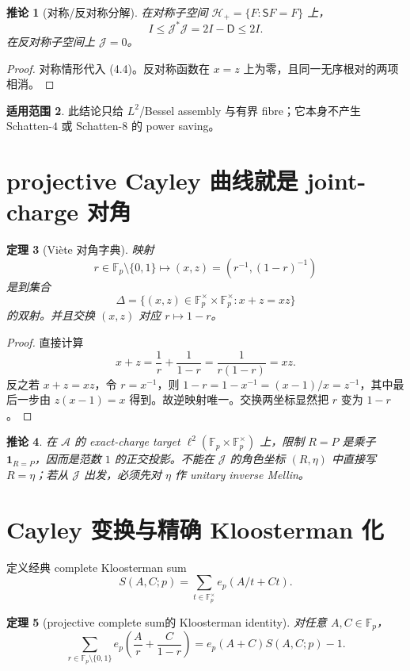 \documentclass[11pt,a4paper]{ctexart}
\newtheorem{theorem}{定理}[section]
\newtheorem{corollary}[theorem]{推论}
\theoremstyle{definition}
\newtheorem{remark}[theorem]{适用范围}
\newcommand{\F}{\mathbb F}
\newcommand{\G}{\F_p^\times}
\newcommand{\ep}{e_p}
\newcommand{\1}{\mathbf 1}
\begin{document}
\begin{corollary}[对称/反对称分解]
在对称子空间 $\mathscr H_+=\{F:\mathsf SF=F\}$ 上，
\[
I\le\mathcal J^*\mathcal J=2I-\mathsf D\le2I.
\tag{4.6}
\]
在反对称子空间上 $\mathcal J=0$。
\end{corollary}

\begin{proof}
对称情形代入 (4.4)。反对称函数在 $x=z$ 上为零，且同一无序根对的两项相消。
\end{proof}

\begin{remark}
此结论只给 $L^2$/Bessel assembly 与有界 fibre；它本身不产生
Schatten-$4$ 或 Schatten-$8$ 的 power saving。
\end{remark}

\section{projective Cayley 曲线就是 joint-charge 对角}

\begin{theorem}[Vi\`ete 对角字典]
映射
\[
r\in\F_p\setminus\{0,1\}
\longmapsto
(x,z)=\left(r^{-1},(1-r)^{-1}\right)
\tag{5.1}
\]
是到集合
\[
\Delta=\{(x,z)\in\G\times\G:x+z=xz\}
\]
的双射。并且交换 $(x,z)$ 对应 $r\mapsto1-r$。
\end{theorem}

\begin{proof}
直接计算
\[
x+z=\frac{1}{r}+\frac1{1-r}
=\frac1{r(1-r)}=xz.
\]
反之若 $x+z=xz$，令 $r=x^{-1}$，则
$1-r=1-x^{-1}=(x-1)/x=z^{-1}$，其中最后一步由
$z(x-1)=x$ 得到。故逆映射唯一。交换两坐标显然把 $r$ 变为 $1-r$。
\end{proof}

\begin{corollary}
在 $\mathcal A$ 的 exact-charge target
$\ell^2(\F_p\times\G)$ 上，限制 $R=P$ 是乘子
$\1_{R=P}$，因而是范数 $1$ 的正交投影。不能在
$\mathcal J$ 的角色坐标 $(R,\eta)$ 中直接写 $R=\eta$；若从
$\mathcal J$ 出发，必须先对 $\eta$ 作 unitary inverse Mellin。
\end{corollary}

\section{Cayley 变换与精确 Kloosterman 化}

定义经典 complete Kloosterman sum
\[
S(A,C;p)=\sum_{t\in\G}\ep(A/t+Ct).
\tag{6.1}
\]

\begin{theorem}[projective complete sum的 Kloosterman identity]
对任意 $A,C\in\F_p$，
\[
\boxed{
\sum_{r\in\F_p\setminus\{0,1\}}
\ep\!\left(\frac A r+\frac C{1-r}\right)
=\ep(A+C)S(A,C;p)-1.}
\tag{6.2}
\]
\end{theorem}
\end{document}

